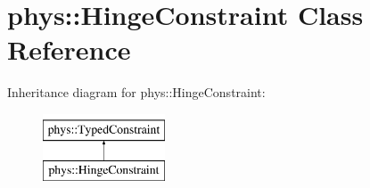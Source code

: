 \hypertarget{classphys_1_1HingeConstraint}{
\section{phys::HingeConstraint Class Reference}
\label{d3/d0d/classphys_1_1HingeConstraint}
}
Inheritance diagram for phys::HingeConstraint:\begin{figure}[H]
\begin{center}
\leavevmode
\includegraphics[height=2cm]{d3/d0d/classphys_1_1HingeConstraint}
\end{center}
\end{figure}
